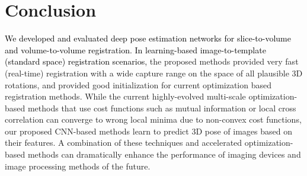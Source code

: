 \documentclass[journal,transmag]{IEEEtran}
\begin{document}
\section{Conclusion}
\textcolor{black}{We developed and evaluated deep pose estimation networks for slice-to-volume and volume-to-volume registration. In learning-based image-to-template (standard space) registration scenarios,} the proposed methods provided very fast (real-time) registration with a wide capture range on the space of all plausible 3D rotations, and provided good initialization for current optimization based registration methods. While the current highly-evolved multi-scale optimization-based methods that use cost functions such as mutual information or local cross correlation can converge to wrong local minima due to non-convex cost functions, our proposed CNN-based methods learn to predict 3D pose of images based on their features. A combination of these techniques and accelerated optimization-based methods can dramatically enhance the performance of imaging devices and image processing methods of the future.

\appendices
{}
\section{}
\label{appendix}
\end{document}
